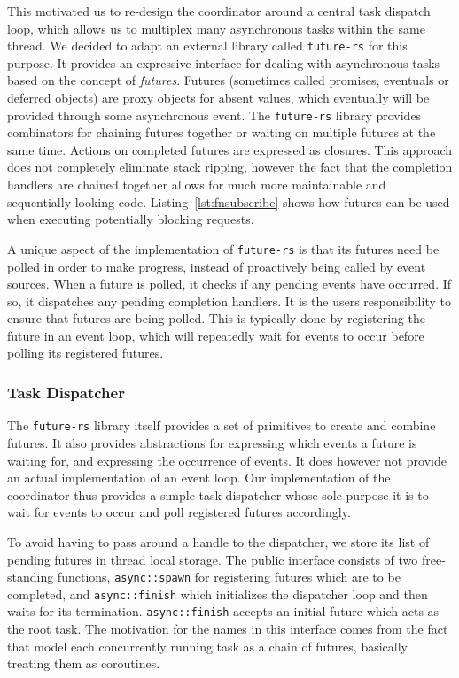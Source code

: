 This motivated us to re-design the coordinator around a central task dispatch loop, which
allows us to multiplex many asynchronous tasks within the same thread. We decided to adapt
an external library called \lstinline{future-rs} \cite{futuresrs} for this purpose.
It provides an expressive interface for dealing with asynchronous tasks based
on the concept of \emph{futures}. Futures (sometimes called promises, eventuals
or deferred objects) are proxy objects for absent values, which eventually will
be provided through some asynchronous event.
The \lstinline{future-rs} library provides combinators for chaining futures
together or waiting on multiple futures at the same time. Actions on completed
futures are expressed as closures. This approach does not completely eliminate
stack ripping, however the fact that the completion handlers are chained together
allows for much more maintainable and sequentially looking code. Listing~\ref{lst:fnsubscribe}
shows how futures can be used when executing potentially blocking requests.

A unique aspect of the implementation of \lstinline{future-rs} is that its futures
need be polled in order to make progress, instead of proactively being called
by event sources. When a future is polled, it checks if any pending events
have occurred. If so, it dispatches any pending completion handlers. 
It is the users responsibility to ensure that futures are being
polled. This is typically done by registering the future in an event loop,
which will repeatedly wait for events to occur before polling its registered
futures.

\subsubsection{Task Dispatcher}
The \lstinline{future-rs} library itself provides a set of primitives to
create and combine futures. It also provides abstractions for expressing which
events a future is waiting for, and expressing the occurrence of events. It
does however not provide an actual implementation of an event loop. Our implementation
of the coordinator thus provides a simple task dispatcher whose sole purpose it is
to wait for events to occur and poll registered futures accordingly.

To avoid having to pass around a handle to the dispatcher, we store its 
list of pending futures in thread local storage. The public interface consists 
of two free-standing functions, \lstinline{async::spawn} for registering
futures which are to be completed, and \lstinline{async::finish} which initializes
the dispatcher loop and then waits for its termination.
\lstinline{async::finish} accepts an initial future which acts as the root task.
The motivation for the names in this interface comes from the fact that model
each concurrently running task as a chain of futures, basically treating them as
coroutines.

